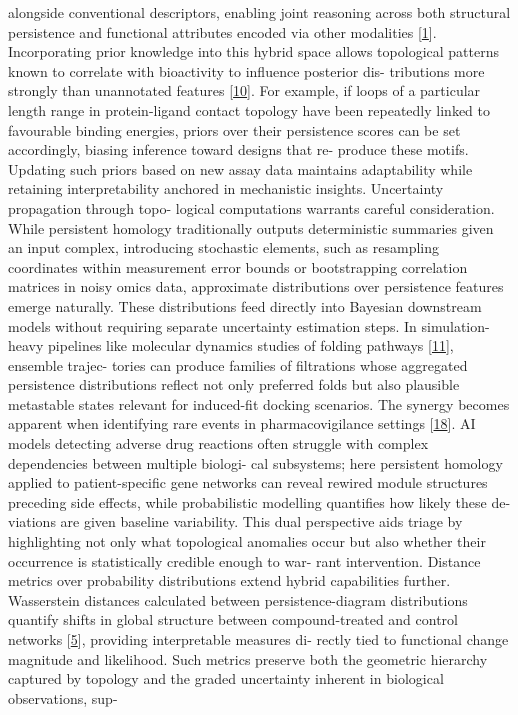 \documentclass[
]{article}
\begin{document}
alongside conventional descriptors, enabling joint reasoning across both
structural persistence and functional attributes encoded via other
modalities {[}\protect\hyperlink{_bookmark41}{1}{]}. Incorporating prior
knowledge into this hybrid space allows topological patterns known to
correlate with bioactivity to influence posterior dis- tributions more
strongly than unannotated features
{[}\protect\hyperlink{_bookmark50}{10}{]}. For example, if loops of a
particular length range in protein-ligand contact topology have been
repeatedly linked to favourable binding energies, priors over their
persistence scores can be set accordingly, biasing inference toward
designs that re- produce these motifs. Updating such priors based on new
assay data maintains adaptability while retaining interpretability
anchored in mechanistic insights. Uncertainty propagation through topo-
logical computations warrants careful consideration. While persistent
homology traditionally outputs deterministic summaries given an input
complex, introducing stochastic elements, such as resampling coordinates
within measurement error bounds or bootstrapping correlation matrices in
noisy omics data, approximate distributions over persistence features
emerge naturally. These distributions feed directly into Bayesian
downstream models without requiring separate uncertainty estimation
steps. In simulation-heavy pipelines like molecular dynamics studies of
folding pathways {[}\protect\hyperlink{_bookmark51}{11}{]}, ensemble
trajec- tories can produce families of filtrations whose aggregated
persistence distributions reflect not only preferred folds but also
plausible metastable states relevant for induced-fit docking scenarios.
The synergy becomes apparent when identifying rare events in
pharmacovigilance settings {[}\protect\hyperlink{_bookmark58}{18}{]}. AI
models detecting adverse drug reactions often struggle with complex
dependencies between multiple biologi- cal subsystems; here persistent
homology applied to patient-specific gene networks can reveal rewired
module structures preceding side effects, while probabilistic modelling
quantifies how likely these de- viations are given baseline variability.
This dual perspective aids triage by highlighting not only what
topological anomalies occur but also whether their occurrence is
statistically credible enough to war- rant intervention. Distance
metrics over probability distributions extend hybrid capabilities
further. Wasserstein distances calculated between persistence-diagram
distributions quantify shifts in global structure between
compound-treated and control networks
{[}\protect\hyperlink{_bookmark45}{5}{]}, providing interpretable
measures di- rectly tied to functional change magnitude and likelihood.
Such metrics preserve both the geometric hierarchy captured by topology
and the graded uncertainty inherent in biological observations, sup-
\end{document}
